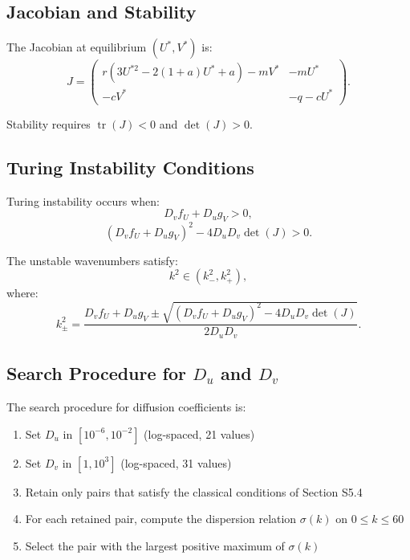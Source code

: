 \documentclass[12pt,a4paper]{article}
\DeclareMathOperator{\tr}{tr}
\begin{document}
	\subsection{Jacobian and Stability}
	
	The Jacobian at equilibrium $(U^*, V^*)$ is:
	\begin{equation}
		J = \begin{pmatrix}
			r (3U^{*2} - 2(1+a)U^* + a) - m V^* & -m U^* \\
			-c V^* & -q - c U^*
		\end{pmatrix}.
	\end{equation}
	
	Stability requires $\tr(J) < 0$ and $\det(J) > 0$.
	
	\subsection{Turing Instability Conditions}
	
	Turing instability occurs when:
	\begin{equation}
		D_v f_U + D_u g_V > 0,
	\end{equation}
	\begin{equation}
		(D_v f_U + D_u g_V)^2 - 4 D_u D_v \det(J) > 0.
	\end{equation}
	
	The unstable wavenumbers satisfy:
	\begin{equation}
		k^2 \in (k_-^2, k_+^2),
	\end{equation}
	where:
	\begin{equation}
		k_{\pm}^2 = \frac{D_v f_U + D_u g_V \pm \sqrt{(D_v f_U + D_u g_V)^2 - 4D_u D_v \det(J)}}{2D_u D_v}.
	\end{equation}
	
	\subsection{Search Procedure for $D_u$ and $D_v$}
	
	The search procedure for diffusion coefficients is:
	\begin{enumerate}
		\item Set $D_u$ in $[10^{-6}, 10^{-2}]$ (log-spaced, 21 values)
		\item Set $D_v$ in $[1, 10^{3}]$ (log-spaced, 31 values)
		\item Retain only pairs that satisfy the classical conditions of Section S5.4
		\item For each retained pair, compute the dispersion relation $\sigma(k)$ on $0\le k\le 60$
		\item Select the pair with the largest positive maximum of $\sigma(k)$
	\end{enumerate}
	
\end{document}

